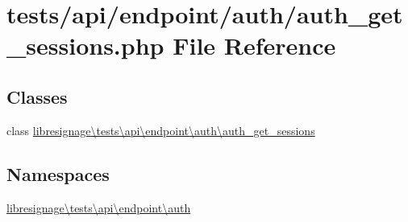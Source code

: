 \hypertarget{tests_2api_2endpoint_2auth_2auth__get__sessions_8php}{}\section{tests/api/endpoint/auth/auth\+\_\+get\+\_\+sessions.php File Reference}
\label{tests_2api_2endpoint_2auth_2auth__get__sessions_8php}
\subsection*{Classes}
\begin{DoxyCompactItemize}
\item 
class \hyperlink{classlibresignage_1_1tests_1_1api_1_1endpoint_1_1auth_1_1auth__get__sessions}{libresignage\textbackslash{}tests\textbackslash{}api\textbackslash{}endpoint\textbackslash{}auth\textbackslash{}auth\+\_\+get\+\_\+sessions}
\end{DoxyCompactItemize}
\subsection*{Namespaces}
\begin{DoxyCompactItemize}
\item 
 \hyperlink{namespacelibresignage_1_1tests_1_1api_1_1endpoint_1_1auth}{libresignage\textbackslash{}tests\textbackslash{}api\textbackslash{}endpoint\textbackslash{}auth}
\end{DoxyCompactItemize}

